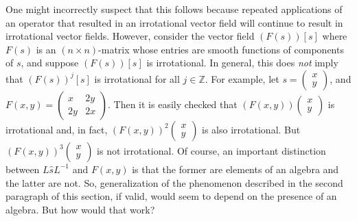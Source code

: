 \documentclass{amsart}
\theoremstyle{definition}
\numberwithin{theorem}{section}
\numberwithin{equation}{section}
\begin{document}
One might incorrectly suspect that this follows because repeated applications of an operator that resulted in an irrotational vector field will continue to result in irrotational vector fields.  However, consider the vector field $(F(s))[s]$ where $F(s)$ is an $(n\times n)$-matrix whose entries are smooth functions of components of $s$, and suppose $(F(s))[s]$ is irrotational.  In general, this does {\it not} imply that $(F(s))^j[s]$ is irrotational for all $j\in\mathbb{Z}$. For example, let \mbox{$s=\left(\begin{array}{ccc}
 x   \\ 
y    
\end{array}\right)$,} and \mbox{$F(x,y)= \left(\begin{array}{ccc}
x  & 2y   \\ 
 2y & 2x    
\end{array}\right)$.}  Then it is easily checked that $(F(x,y))\left(\begin{array}{ccc}
 x   \\ 
y    
\end{array}\right)$ is \mbox{irrotational} and, in fact, $(F(x,y))^2\left(\begin{array}{ccc}
 x   \\ 
y    
\end{array}\right)$ is also irrotational.  But $(F(x,y))^3\left(\begin{array}{ccc}
 x   \\ 
y    
\end{array}\right)$ is not irrotational.  Of course, an important distinction between $L\hat{s}L^{-1}$ and $F(x,y)$ is that the former are elements of an algebra and the latter are not.  So, generalization of the phenomenon described in the second paragraph of this section, if valid, would seem to depend on the presence of an algebra.  But how would that work?
\end{document}
